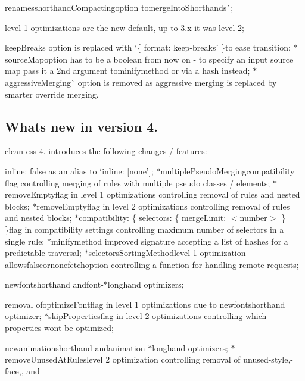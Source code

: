 \begin{DoxyItemize}
\item {\ttfamily renames}shorthand\+Compacting{\ttfamily option to}merge\+Into\+Shorthands\`{};
\item level 1 optimizations are the new default, up to 3.\+x it was level 2;
\item {\ttfamily keep\+Breaks} option is replaced with `\{ format\+: \textquotesingle{}keep-\/breaks' \}{\ttfamily to ease transition; $\ast$}source\+Map{\ttfamily option has to be a boolean from now on -\/ to specify an input source map pass it a 2nd argument to}minify{\ttfamily method or via a hash instead; $\ast$}aggressive\+Merging\`{} option is removed as aggressive merging is replaced by smarter override merging.
\end{DoxyItemize}

\subsection*{What\textquotesingle{}s new in version 4.}

clean-\/css 4. introduces the following changes / features\+:


\begin{DoxyItemize}
\item {\ttfamily inline\+: false} as an alias to `inline\+: \mbox{[}\textquotesingle{}none'\mbox{]}{\ttfamily ; $\ast$}multiple\+Pseudo\+Merging{\ttfamily compatibility flag controlling merging of rules with multiple pseudo classes / elements; $\ast$}remove\+Empty{\ttfamily flag in level 1 optimizations controlling removal of rules and nested blocks; $\ast$}remove\+Empty{\ttfamily flag in level 2 optimizations controlling removal of rules and nested blocks; $\ast$}compatibility\+: \{ selectors\+: \{ merge\+Limit\+: $<$number$>$ \} \}{\ttfamily flag in compatibility settings controlling maximum number of selectors in a single rule; $\ast$}minify{\ttfamily method improved signature accepting a list of hashes for a predictable traversal; $\ast$}selectors\+Sorting\+Method{\ttfamily level 1 optimization allows}false{\ttfamily or}\textquotesingle{}nonefetch{\ttfamily option controlling a function for handling remote requests;}
\item {\ttfamily new}font{\ttfamily shorthand and}font-\/$\ast${\ttfamily longhand optimizers;}
\item {\ttfamily removal of}optimize\+Font{\ttfamily flag in level 1 optimizations due to new}font{\ttfamily shorthand optimizer; $\ast$}skip\+Properties{\ttfamily flag in level 2 optimizations controlling which properties won\textquotesingle{}t be optimized;}
\item {\ttfamily new}animation{\ttfamily shorthand and}animation-\/$\ast${\ttfamily longhand optimizers; $\ast$}remove\+Unused\+At\+Rules{\ttfamily level 2 optimization controlling removal of unused}-\/style{\ttfamily ,}-\/face{\ttfamily ,}{\ttfamily , and} 
\end{DoxyItemize}